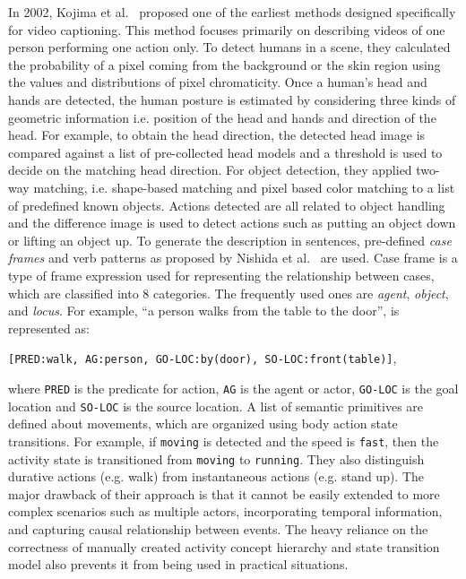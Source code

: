 \documentclass[10pt,journal,compsoc]{IEEEtran}
\begin{document}
\vspace{2mm}
 In 2002, Kojima et al.~\cite{kojima2002natural} proposed one of the earliest methods designed specifically for video captioning. This method focuses primarily on describing videos of one person performing one action only. To detect humans in a scene, they calculated the probability of a pixel coming from the background or the skin region using the values and distributions of pixel chromaticity. Once a human's head and hands are detected, the human posture is estimated by considering three kinds of geometric information i.e. position of the head and hands and direction of the head. For example, to obtain the head direction, the detected head image is compared against a list of pre-collected head models and a threshold is used to decide on the matching head direction. For object detection, they applied two-way matching, i.e. shape-based matching and pixel based color matching to a list of predefined known objects. Actions detected are all related to object handling and the difference image is used to detect actions such as putting an object down or lifting an object up. To generate the description in sentences, pre-defined {\it case frames} and verb patterns as proposed by Nishida et al.~\cite{nishida1988feedback, nishida1982japanese} are used. Case frame is a type of frame expression used for representing the relationship between cases, which are classified into 8 categories. The frequently used ones are \textit{agent}, \textit{object}, and \textit{locus}. For example, ``a person walks from the table to the door'', is represented as:

{\tt[PRED:walk, AG:person, GO-LOC:by(door), SO-LOC:front(table)]},

\noindent
where {\tt PRED} is the predicate for action, {\tt AG} is the agent or actor, {\tt GO-LOC} is the goal location and {\tt SO-LOC} is the source location. A list of semantic primitives are defined about movements, which are organized using body action state transitions. For example, if {\tt moving} is detected and the speed is {\tt fast}, then the activity state is transitioned from {\tt moving} to {\tt running}. They also distinguish durative actions (e.g. walk) from instantaneous actions (e.g. stand up). The major drawback of their approach is that it cannot be easily extended to more complex scenarios such as multiple actors, incorporating temporal information, and capturing causal relationship between events. The heavy reliance on the correctness of manually created activity concept hierarchy and state transition model also prevents it from being used in practical situations. 
\end{document}
